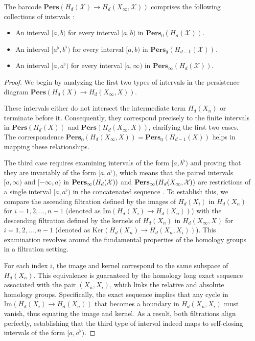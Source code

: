 \begin{corollary}
The barcode $\textbf{Pers}(H_{d}(\mathcal{X}) \rightarrow H_{d}(X_{\infty}, \mathcal{X}))$ comprises the following collections of intervals \cite[\S 2.5]{de2011dualities}:
\begin{itemize}
    \item An interval $[a, b)$ for every interval $[a, b)$ in $\textbf{Pers}_{0}(H_{d}(\mathcal{X}))$.
    \item An interval $[a^{\flat}, b^{\flat})$ for every interval $[a, b)$ in $\textbf{Pers}_{0}(H_{d-1}(\mathcal{X}))$.
    \item An interval $[a, a^{\flat})$ for every interval $[a, \infty)$ in $\textbf{Pers}_{\infty}(H_{d}(\mathcal{X}))$.
\end{itemize}
\end{corollary}

\begin{proof}
	We begin by analyzing the first two types of intervals in the persistence diagram
	$\textbf{Pers}(H_{d}(X) \to H_{d}(X_{\infty}, X))$.
	
	These intervals either do
	not intersect the intermediate term $H_{d}(X_{n})$ or terminate before it. Consequently,
	they correspond precisely to the finite intervals in $\textbf{Pers}(H_{d}(X))$
	and $\textbf{Pers}(H_{d}(X_{\infty}, X))$, clarifying the first two cases. The
	correspondence
	$\textbf{Pers}_{0}(H_{d}(X_{\infty}, X)) = \textbf{Pers}_{0}(H_{d-1}(X))$
	helps in mapping these relationships.

	The third case requires examining intervals of the form $[a, b^{\flat})$ and
	proving that they are invariably of the form $[a, a^{\flat})$, which means that
	the paired intervals $[a,\infty)$ and $[-\infty,a)$ in $\textbf{Pers}_{\infty}(
	H_{d}({\mathcal{X}}))$ and $\textbf{Pers}_{\infty}(H_{d}(X_{\infty}, {\mathcal{X}}))$ are restrictions
	of a single interval $[a,a^{\flat})$ in the concatenated sequence \cite[p.6]{de2011dualities}.
	To establish this, we compare the ascending filtration defined by the images of
	$H_{d}(X_{i})$ in $H_{d}(X_{n})$ for $i = 1, 2, \ldots, n-1$ (denoted as
	$\text{Im}(H_{d}(X_{i}) \to H_{d}(X_{n}))$) with the descending filtration defined
	by the kernels of $H_{d}(X_{n})$ in $H_{d}(X_{\infty}, X)$ for $i = 1, 2, \ldots
	, n-1$ (denoted as $\text{Ker}(H_{d}(X_{n}) \to H_{d}(X_{n}, X_{i}))$). This
	examination revolves around the fundamental properties of the homology groups
	in a filtration setting.

	For each index $i$, the image and kernel correspond to the same subspace of $H_{d}
	(X_{n})$. This equivalence is guaranteed by the homology long exact sequence
	associated with the pair $(X_{n}, X_{i})$, which links the relative and absolute
	homology groups. Specifically, the exact sequence implies that any cycle in $\text{Im}
	(H_{d}(X_{i}) \to H_{d}(X_{n}))$ that becomes a boundary in $H_{d}(X_{n}, X_{i}
	)$ must vanish, thus equating the image and kernel. As a result, both
	filtrations align perfectly, establishing that the third type of interval indeed
	maps to self-closing intervals of the form $[a, a^{\flat})$.
\end{proof}


